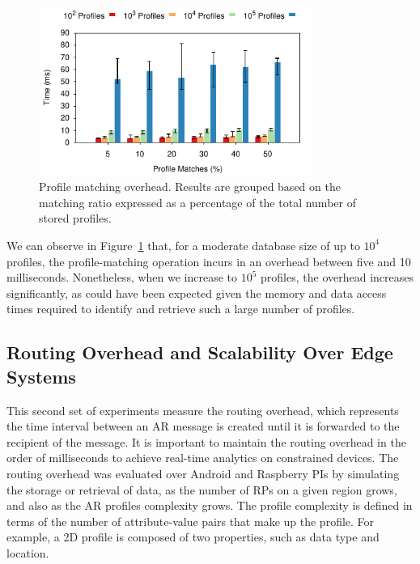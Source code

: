\begin{figure}[htb!]
  \centering
    \includegraphics[width=0.8\textwidth]{Figures/profileQuery.pdf}
  \caption{Profile matching overhead. Results are grouped based on the matching ratio expressed as a percentage of the total number of stored profiles.} \label{fig:profileQuery}
\end{figure}

We can observe in Figure~\ref{fig:profileQuery} that, for a moderate database size of up to $10^4$ profiles, the profile-matching operation incurs in an overhead between five and 10 milliseconds. Nonetheless, when we increase to $10^5$ profiles, the overhead increases significantly, as could have been expected given the memory and data access times required to identify and retrieve such a large number of profiles.

\subsection{Routing Overhead and Scalability Over Edge Systems}

This second set of experiments measure the routing overhead, which represents the time interval between an AR message is created until it is forwarded to the recipient of the message. It is important to maintain the routing overhead in the order of milliseconds to achieve real-time analytics on constrained devices. The routing overhead was evaluated over Android and Raspberry PIs by simulating the storage or retrieval of data, as the number of RPs on a given region grows, and also as the AR profiles complexity grows. The profile complexity is defined in terms of the number of attribute-value pairs that make up the profile. For example, a 2D profile is composed of two properties, such as data type and location.

